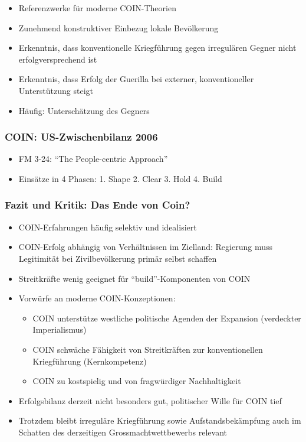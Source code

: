 {}\documentclass[a4paper]{article}
\providecommand{\tightlist}{\setlength{\itemsep}{1mm}\setlength{\parskip}{1mm}}
\begin{document}
\begin{itemize}
	\tightlist
	\item
	      Referenzwerke für moderne COIN-Theorien
	\item
	      Zunehmend konstruktiver Einbezug lokale Bevölkerung
	\item
	      Erkenntnis, dass konventionelle Kriegführung gegen irregulären Gegner
	      nicht erfolgversprechend ist
	\item
	      Erkenntnis, dass Erfolg der Guerilla bei externer, konventioneller
	      Unterstützung steigt
	\item
	      Häufig: Unterschätzung des Gegners
\end{itemize}

\subsubsection{COIN: US-Zwischenbilanz
	2006}\label{coin-us-zwischenbilanz-2006}

\begin{itemize}
	\tightlist
	\item
	      FM 3-24: ``The People-centric Approach''
	\item
	      Einsätze in 4 Phasen: 1. Shape 2. Clear 3. Hold 4. Build
\end{itemize}

\subsubsection{Fazit und Kritik: Das Ende von
	Coin?}\label{fazit-und-kritik-das-ende-von-coin}

\begin{itemize}
	\tightlist
	\item
	      COIN-Erfahrungen häufig selektiv und idealisiert
	\item
	      COIN-Erfolg abhängig von Verhältnissen im Zielland: Regierung muss
	      Legitimität bei Zivilbevölkerung primär selbst schaffen
	\item
	      Streitkräfte wenig geeignet für ``build''-Komponenten von COIN
	\item
	      Vorwürfe an moderne COIN-Konzeptionen:

	      \begin{itemize}
		      \tightlist
		      \item
		            COIN unterstütze westliche politische Agenden der Expansion
		            (verdeckter Imperialismus)
		      \item
		            COIN schwäche Fähigkeit von Streitkräften zur konventionellen
		            Kriegführung (Kernkompetenz)
		      \item
		            COIN zu kostspielig und von fragwürdiger Nachhaltigkeit
	      \end{itemize}
	\item
	      Erfolgsbilanz derzeit nicht besonders gut, politischer Wille für COIN
	      tief
	\item
	      Trotzdem bleibt irreguläre Kriegführung sowie Aufstandsbekämpfung auch
	      im Schatten des derzeitigen Grossmachtwettbewerbs relevant
\end{itemize}
\end{document}

